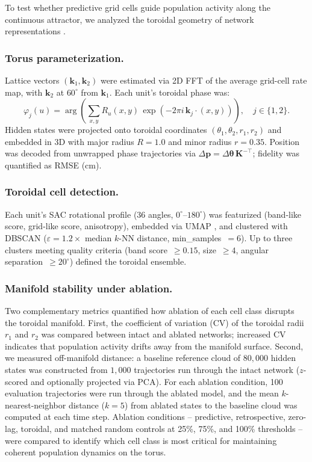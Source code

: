 \documentclass[11pt]{article}
\begin{document}
To test whether predictive grid cells guide population activity along the continuous attractor, we analyzed the toroidal geometry of network representations \cite{gardner2022}.

\subsubsection*{Torus parameterization.}
Lattice vectors $(\mathbf{k}_1, \mathbf{k}_2)$ were estimated via 2D FFT of the average grid-cell rate map, with $\mathbf{k}_2$ at $60^\circ$ from $\mathbf{k}_1$. Each unit's toroidal phase was:
\begin{equation}
    \varphi_j(u) = \arg\!\left(\sum_{x,y} R_u(x,y)\,\exp\!\left(-2\pi i\,\mathbf{k}_j \cdot (x, y)\right)\right),\quad j \in \{1,2\}.
\end{equation}
Hidden states were projected onto toroidal coordinates $(\theta_1, \theta_2, r_1, r_2)$ and embedded in 3D with major radius $R = 1.0$ and minor radius $r = 0.35$. Position was decoded from unwrapped phase trajectories via $\Delta\mathbf{p} = \Delta\boldsymbol{\theta}\,\mathbf{K}^{-\top}$; fidelity was quantified as RMSE (cm).

\subsubsection*{Toroidal cell detection.}
Each unit's SAC rotational profile (36 angles, $0^\circ$--$180^\circ$) was featurized (band-like score, grid-like score, anisotropy), embedded via UMAP \cite{mcinnes2018}, and clustered with DBSCAN ($\varepsilon = 1.2\times$ median $k$-NN distance, min\_samples~$= 6$). Up to three clusters meeting quality criteria (band score~$\ge 0.15$, size~$\ge 4$, angular separation~$\ge 20^\circ$) defined the toroidal ensemble.

\subsubsection*{Manifold stability under ablation.}
Two complementary metrics quantified how ablation of each cell class disrupts the toroidal manifold. First, the coefficient of variation (CV) of the toroidal radii $r_1$ and $r_2$ was compared between intact and ablated networks; increased CV indicates that population activity drifts away from the manifold surface. Second, we measured off-manifold distance: a baseline reference cloud of $80{,}000$ hidden states was constructed from $1{,}000$ trajectories run through the intact network ($z$-scored and optionally projected via PCA). For each ablation condition, 100 evaluation trajectories were run through the ablated model, and the mean $k$-nearest-neighbor distance ($k = 5$) from ablated states to the baseline cloud was computed at each time step. Ablation conditions -- predictive, retrospective, zero-lag, toroidal, and matched random controls at 25\%, 75\%, and 100\% thresholds -- were compared to identify which cell class is most critical for maintaining coherent population dynamics on the torus.
\end{document}
